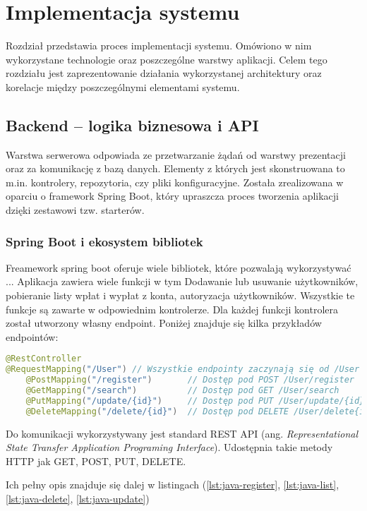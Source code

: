 \chapter{Implementacja systemu}
Rozdział  przedstawia proces implementacji systemu. Omówiono w nim wykorzystane technologie oraz poszczególne warstwy aplikacji. Celem tego rozdziału jest zaprezentowanie działania wykorzystanej architektury oraz korelacje między poszczególnymi elementami systemu.
\section{Backend – logika biznesowa i API}
Warstwa serwerowa odpowiada ze przetwarzanie żądań od warstwy prezentacji oraz za komunikację z bazą danych. Elementy z których jest skonstruowana to m.in. kontrolery, repozytoria, czy pliki konfiguracyjne. Została zrealizowana w oparciu o framework Spring Boot, który upraszcza proces tworzenia aplikacji dzięki zestawowi tzw. starterów.

\subsection*{Spring Boot i ekosystem bibliotek}
Freamework spring boot oferuje wiele bibliotek, które pozwalają wykorzystywać ...
Aplikacja zawiera wiele funkcji w tym Dodawanie lub usuwanie użytkowników, pobieranie listy wpłat i wypłat z konta, autoryzacja użytkowników. Wszystkie te funkcje są zawarte w odpowiednim kontrolerze. Dla każdej funkcji kontrolera został utworzony własny endpoint. Poniżej znajduje się kilka przykładów endpointów:
\begin{lstlisting}[language={Java}, caption={Przykładowe Endpointy}, label={lst:java-endpoints}]
@RestController 
@RequestMapping("/User") // Wszystkie endpointy zaczynają się od /User
	@PostMapping("/register")		// Dostęp pod POST /User/register
	@GetMapping("/search")			// Dostęp pod GET /User/search
	@PutMapping("/update/{id}")		// Dostęp pod PUT /User/update/{id}
	@DeleteMapping("/delete/{id}")	// Dostęp pod DELETE /User/delete{id}
\end{lstlisting}
Do komunikacji wykorzystywany jest standard REST API (ang. \textit{Representational State Transfer Application Programing Interface}). Udostępnia takie metody HTTP jak GET, POST, PUT, DELETE.

Ich pełny opis znajduje się dalej w listingach (\ref{lst:java-register}, \ref{lst:java-list}, \ref{lst:java-delete}, \ref{lst:java-update})
